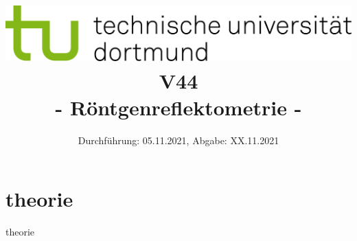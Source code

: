 
\usepackage{romannum}

\title{\includegraphics[scale=0.8]{../logo.jpg} \\ \vspace*{1cm} V44 \\ - Röntgenreflektometrie -}

\date{Durchführung: 05.11.2021, Abgabe: XX.11.2021}



\maketitle

\tableofcontents
\newpage


\section{theorie}

theorie\cite{anleitung}


\nocite{*}
\printbibliography{}
